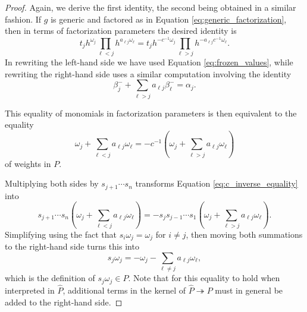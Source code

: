 \documentclass[12pt]{amsart}
\newcommand\onto{\twoheadrightarrow}
\theoremstyle{remark}
\numberwithin{equation}{section}
\begin{document}
\begin{proof}
Again, we derive the first identity, the second being obtained in a similar fashion. If $g$ is generic and factored as in Equation \ref{eq:generic_factorization}, then in terms of factorization parameters the desired identity is
\begin{equation}
t_j
    h^{\omega_j}
    \prod_{\ell<j}h^{a_{\ell j}\omega_\ell} = 
t_j
    h^{-c^{-1}\omega_j}
    \prod_{\ell>j}h^{-a_{\ell j}c^{-1}\omega_\ell}.
\end{equation}
In rewriting the left-hand side we have used Equation \ref{eq:frozen_values}, while rewriting the right-hand side uses a similar computation involving the identity
\[
    \beta_j^-+\sum_{\ell>j}a_{\ell j}\beta_\ell^-
    =
    \alpha_j.
\]

  This equality of monomials in factorization parameters is then equivalent to the equality
  \begin{equation}\label{eq:c_inverse_equality}
    \omega_j + \sum_{\ell<j} a_{\ell j}\omega_\ell
    =
    -c^{-1}\left(\omega_j + \sum_{\ell>j} a_{\ell j}\omega_\ell\right)
  \end{equation}
of weights in $P$. 
  
Multiplying both sides by $s_{j+1}\cdots s_n$ transforms Equation \ref{eq:c_inverse_equality} into
  \[
    s_{j+1}\cdots s_n\left(\omega_j + \sum_{\ell<j} a_{\ell j}\omega_\ell\right)=
    -s_js_{j-1}\cdots s_1\left(\omega_j + \sum_{\ell>j} a_{\ell j}\omega_\ell\right).
  \]
Simplifying using the fact that $s_i\omega_j=\omega_j$ for $i\neq j$, then moving both summations to the right-hand side turns this into
  \begin{equation}
    s_j\omega_j
    =
    -\omega_j-\sum_{\ell\neq j}a_{\ell j}\omega_\ell,
  \end{equation}
  which is the definition of $s_j\omega_j \in P$. Note that for this equality to hold when interpreted in $\widehat{P}$, additional terms in the kernel of $\widehat{P} \onto P$ must in general be added to the right-hand side.
\end{proof}
\end{document}
